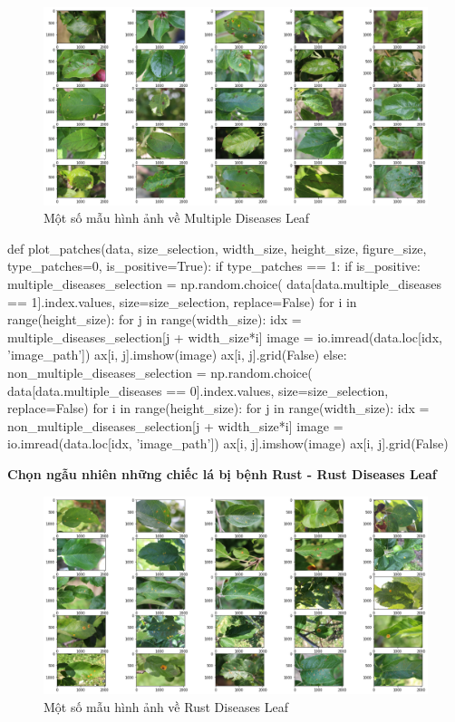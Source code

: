 \documentclass{article}
\begin{document}
	\begin{figure}[H]
		\centering
		\includegraphics[width=1\linewidth]{images/sample_multiple_diseases_leaf.png}
		\caption{Một số mẫu hình ảnh về Multiple Diseases Leaf}
		\label{fig:writing-thesis}
	\end{figure}
	\begin{python}
		def plot_patches(data, size_selection, width_size, height_size, figure_size, type_patches=0, is_positive=True):
			if type_patches == 1:
				if is_positive:
				multiple_diseases_selection = np.random.choice(
				data[data.multiple_diseases == 1].index.values, size=size_selection, replace=False)
				for i in range(height_size):
					for j in range(width_size):
						idx = multiple_diseases_selection[j + width_size*i]
						image = io.imread(data.loc[idx, 'image_path'])
						ax[i, j].imshow(image)
						ax[i, j].grid(False)
				else:
					non_multiple_diseases_selection = np.random.choice(
					data[data.multiple_diseases == 0].index.values, size=size_selection, replace=False)
					for i in range(height_size):
						for j in range(width_size):
							idx = non_multiple_diseases_selection[j + width_size*i]
							image = io.imread(data.loc[idx, 'image_path'])
							ax[i, j].imshow(image)
							ax[i, j].grid(False)
	\end{python}
	\textbf{Chọn ngẫu nhiên những chiếc lá bị bệnh Rust - Rust Diseases Leaf}
	\begin{figure}[H]
		\centering
		\includegraphics[width=1\linewidth]{images/sample_rust_leaf.png}
		\caption{Một số mẫu hình ảnh về Rust Diseases Leaf}
		\label{fig:writing-thesis}
	\end{figure}
\end{document}
